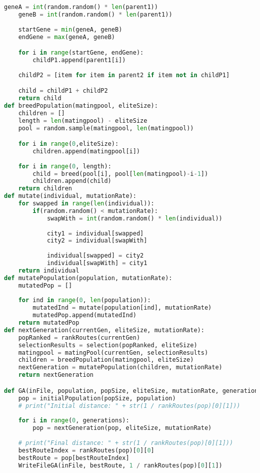 \begin{lstlisting}[language=Python]
    geneA = int(random.random() * len(parent1))
    geneB = int(random.random() * len(parent1))
    
    startGene = min(geneA, geneB)
    endGene = max(geneA, geneB)

    for i in range(startGene, endGene):
        childP1.append(parent1[i])
        
    childP2 = [item for item in parent2 if item not in childP1]

    child = childP1 + childP2
    return child
def breedPopulation(matingpool, eliteSize):
    children = []
    length = len(matingpool) - eliteSize
    pool = random.sample(matingpool, len(matingpool))

    for i in range(0,eliteSize):
        children.append(matingpool[i])
    
    for i in range(0, length):
        child = breed(pool[i], pool[len(matingpool)-i-1])
        children.append(child)
    return children
def mutate(individual, mutationRate):
    for swapped in range(len(individual)):
        if(random.random() < mutationRate):
            swapWith = int(random.random() * len(individual))
            
            city1 = individual[swapped]
            city2 = individual[swapWith]
            
            individual[swapped] = city2
            individual[swapWith] = city1
    return individual
def mutatePopulation(population, mutationRate):
    mutatedPop = []
    
    for ind in range(0, len(population)):
        mutatedInd = mutate(population[ind], mutationRate)
        mutatedPop.append(mutatedInd)
    return mutatedPop
def nextGeneration(currentGen, eliteSize, mutationRate):
    popRanked = rankRoutes(currentGen)
    selectionResults = selection(popRanked, eliteSize)
    matingpool = matingPool(currentGen, selectionResults)
    children = breedPopulation(matingpool, eliteSize)
    nextGeneration = mutatePopulation(children, mutationRate)
    return nextGeneration

def GA(inFile, population, popSize, eliteSize, mutationRate, generations):
    pop = initialPopulation(popSize, population)
    # print("Initial distance: " + str(1 / rankRoutes(pop)[0][1]))
    
    for i in range(0, generations):
        pop = nextGeneration(pop, eliteSize, mutationRate)
    
    # print("Final distance: " + str(1 / rankRoutes(pop)[0][1]))
    bestRouteIndex = rankRoutes(pop)[0][0]
    bestRoute = pop[bestRouteIndex]
    WriteFileGA(inFile, bestRoute, 1 / rankRoutes(pop)[0][1])
\end{lstlisting}